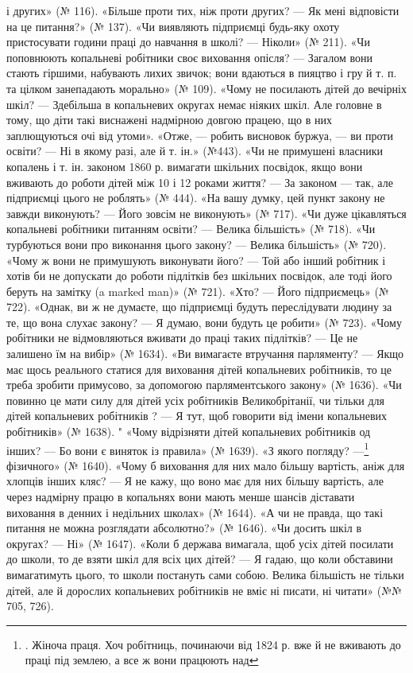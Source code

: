 \parcont{}  %
і других» (№ 116). «Більше проти тих, ніж проти других? — Як
мені відповісти на це питання?» (№ 137). «Чи виявляють підприємці
будь-яку охоту пристосувати години праці до навчання
в школі? — Ніколи» (№ 211). «Чи поповнюють копальневі
робітники своє виховання опісля? — Загалом вони стають гіршими,
набувають лихих звичок; вони вдаються в пияцтво і гру
й т. п. та цілком занепадають морально» (№ 109). «Чому не посилають
дітей до вечірніх шкіл? — Здебільша в копальневих округах
немає ніяких шкіл. Але головне в тому, що діти такі виснажені
надмірною довгою працею, що в них заплющуються очі від утоми».
«Отже, — робить висновок буржуа, — ви проти освіти? — Ні в
якому разі, але й т. ін.» (№443). «Чи не примушені власники
копалень і т. ін. законом 1860 р. вимагати шкільних посвідок,
якщо вони вживають до роботи дітей між 10 і 12 роками життя? —
За законом — так, але підприємці цього не роблять» (№ 444).
«На вашу думку, цей пункт закону не завжди виконують? —
Його зовсім не виконують» (№ 717). «Чи дуже цікавляться копальневі
робітники питанням освіти? — Велика більшість» (№ 718).
«Чи турбуються вони про виконання цього закону? — Велика
більшість» (№ 720). «Чому ж вони не примушують виконувати
його? — Той або інший робітник і хотів би не допускати до роботи
підлітків без шкільних посвідок, але тоді його беруть на замітку
(a marked man)» (№ 721). «Хто? — Його підприємець» (№ 722).
«Однак, ви ж не думаєте, що підприємці будуть переслідувати
людину за те, що вона слухає закону? — Я думаю, вони будуть
це робити» (№ 723). «Чому робітники не відмовляються вживати
до праці таких підлітків? — Це не залишено їм на вибір» (№ 1634).
«Ви вимагаєте втручання парляменту? — Якщо має щось реального
статися для виховання дітей копальневих робітників, то
це треба зробити примусово, за допомогою парляментського закону»
(№ 1636). «Чи повинно це мати силу для дітей усіх робітників
Великобрітанії, чи тільки для дітей копальневих робітників
? — Я тут, щоб говорити від імени копальневих робітників»
(№ 1638). " «Чому відрізняти дітей копальневих робітників од
інших? — Бо вони є виняток із правила» (№ 1639). «З якого
погляду? —\footnote{
. Жіноча праця. Хоч робітниць, починаючи від 1824 р. вже
й не вживають до праці під землею, а все ж вони працюють над
} фізичного» (№ 1640). «Чому б виховання для них
мало більшу вартість, аніж для хлопців інших кляс? — Я не
кажу, що воно має для них більшу вартість, але через надмірну
працю в копальнях вони мають менше шансів діставати виховання
в денних і недільних школах» (№ 1644). «А чи не правда,
що такі питання не можна розглядати абсолютно?» (№ 1646).
«Чи досить шкіл в округах? — Ні» (№ 1647). «Коли б держава
вимагала, щоб усіх дітей посилати до школи, то де взяти шкіл
для всіх цих дітей? — Я гадаю, що коли обставини вимагатимуть
цього, то школи постануть сами собою. Велика більшість
не тільки дітей, але й дорослих копальневих робітників не вміє
ні писати, ні читати» (№№ 705, 726).
\parbreak{}  %
